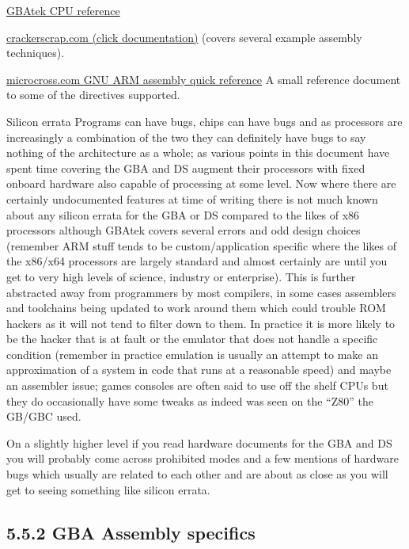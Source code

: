 \documentclass[
]{book}
\begin{document}
\href{http://problemkaputt.de/gbatek.htm\#cpuoverview}{GBAtek CPU reference}

\href{https://web.archive.org/web/20100606044629/http://crackerscrap.com/docs.php}{crackerscrap.com (click documentation)} (covers several example assembly techniques).

\href{http://microcross.com/GNU-ARM-Assy-Quick-Ref.pdf}{microcross.com GNU ARM assembly quick reference} A small reference document to some of the directives supported.

Silicon errata Programs can have bugs, chips can have bugs and as processors are increasingly a combination of the two they can definitely have bugs to say nothing of the architecture as a whole; as various points in this document have spent time covering the GBA and DS augment their processors with fixed onboard hardware also capable of processing at some level. Now where there are certainly undocumented features at time of writing there is not much known about any silicon errata for the GBA or DS compared to the likes of x86 processors although GBAtek covers several errors and odd design choices (remember ARM stuff tends to be custom/application specific where the likes of the x86/x64 processors are largely standard and almost certainly are until you get to very high levels of science, industry or enterprise). This is further abstracted away from programmers by most compilers, in some cases assemblers and toolchains being updated to work around them which could trouble ROM hackers as it will not tend to filter down to them. In practice it is more likely to be the hacker that is at fault or the emulator that does not handle a specific condition (remember in practice emulation is usually an attempt to make an approximation of a system in code that runs at a reasonable speed) and maybe an assembler issue; games consoles are often said to use off the shelf CPUs but they do occasionally have some tweaks as indeed was seen on the ``Z80'' the GB/GBC used.

On a slightly higher level if you read hardware documents for the GBA and DS you will probably come across prohibited modes and a few mentions of hardware bugs which usually are related to each other and are about as close as you will get to seeing something like silicon errata.

\hypertarget{gba-assembly-specifics}{%
\subsection{5.5.2 GBA Assembly specifics}\label{gba-assembly-specifics}}
\end{document}
